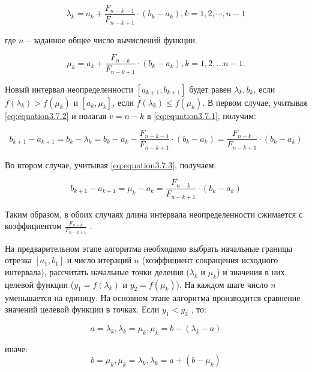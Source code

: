 \begin{equation}
\label{eq:equation3.7.2}
\lambda_k = a_k + \frac{F_{n-k-1}}{F_{n-k+1}} \cdot (b_k - a_k), k=1,2,\cdots, n-1
\end{equation} 

где $n$ – заданное общее число вычислений функции.

\begin{equation}
\label{eq:equation3.7.3}
\mu_k = a_k + \frac{F_{n-k}}{F_{n-k+1}} \cdot (b_k - a_k), k = 1,2,...n-1.	
\end{equation} 

Новый интервал неопределенности $[a_{k+1},b_{k+1}]$ будет равен $\lambda_k, b_k$, если $f(\lambda_k) > f(\mu_k)$ и $[a_k, \mu_k]$, если $f(\lambda_k) \leq f(\mu_k)$. В первом случае, учитывая \ref{eq:equation3.7.2} и полагая $v = n-k$ в \ref{eq:equation3.7.1}, получим:

\begin{equation}
\label{eq:equation3.7.4}
b_{k+1} - a_{k+1} = b_k - \lambda_k = b_k - a_k - \frac{F_{n-k-1}}{F_{n-k+1}} \cdot (b_k - a_k) = \frac{F_{n-k}}{F_{n-k+1}} \cdot (b_k - a_k)
\end{equation} 

Во втором случае, учитывая \ref{eq:equation3.7.3}, получаем:

\begin{equation}
\label{eq:equation3.7.5}
b_{k+1} - a_{k+1} = \mu_k - a_k = \frac{F_{n-k}}{F_{n-k+1}} \cdot (b_k - a_k)
\end{equation} 

Таким образом, в обоих случаях длина интервала неопределенности сжимается с коэффициентом $\frac{F_{n-k}}{F_{n-k+1}}$ .

На предварительном этапе алгоритма необходимо выбрать начальные границы отрезка $[a_1, b_1]$ и число итераций $n$ (коэффициент сокращения исходного интервала), рассчитать начальные точки деления ($\lambda_k$ и $\mu_k$) и значения в них целевой функции ($y_1 = f (\lambda_k)$  и $y_2 = f (\mu_k)$). На каждом шаге число $n$ уменьшается на единицу. На основном этапе алгоритма производится сравнение значений целевой функции в точках. Если $y_1 < y_2$ , то:

\begin{equation}
	\label{eq:equation3.7.6}
a = \lambda_k,
\lambda_k = \mu_k, \mu_k = b- (\lambda_k - a) 
\end{equation}

иначе:
\begin{equation}
\label{eq:equation3.7.7}
	b = \mu_k,
	\mu_k = \lambda_k, \lambda_k = a + (b - \mu_k) 
\end{equation}

